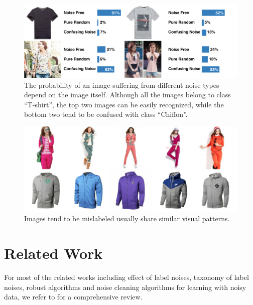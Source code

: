 \documentclass[10pt,twocolumn,letterpaper]{article}
\begin{document}
\begin{figure}[t]
\begin{center}
\includegraphics[width=1.0\linewidth]{figure/noise_level.pdf}
\end{center}
\caption{The probability of an image suffering from different noise types depend on the image itself. Although all the images belong to class ``T-shirt'', the top two images can be easily recognized, while the bottom two tend to be confused with class ``Chiffon''.}
\label{fig:compare_noise_level}
\end{figure}

\begin{figure}[t]
\begin{center}
\includegraphics[width=1.0\linewidth]{figure/noise_cluster.pdf}
\end{center}
\caption{Images tend to be mislabeled usually share similar visual patterns.}
\label{fig:noise_cluster}
\end{figure}


\section{Related Work} %
\label{sec:related_work}
For most of the related works including effect of label noises, taxonomy of label noises, robust algorithms and noise cleaning algorithms for learning with noisy data, we refer to \cite{frenay2013classification} for a comprehensive review. 
\end{document}
